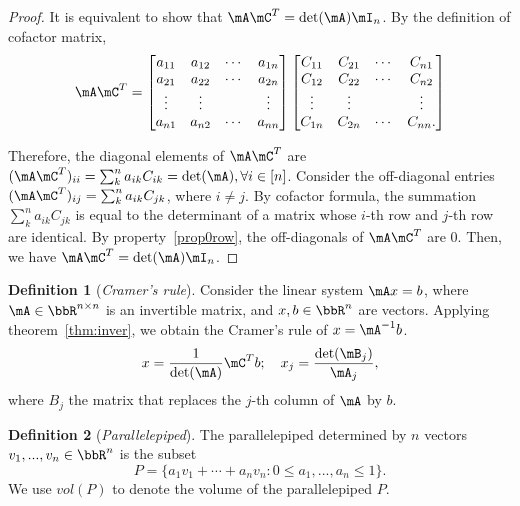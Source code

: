 \documentclass[11pt]{article}
\theoremstyle{plain}
\theoremstyle{definition}
\newtheorem{defn}{Definition}
\begin{document}
\begin{proof}
	It is equivalent to  show that $\mA \mC^T = \det(\mA) \mI_n$. By the definition of cofactor matrix,
	\begin{align}
		\mA  \mC^T = \begin{bmatrix}
			a_{11} & a_{12} &\cdots &a_{1n}\\
			a_{21} & a_{22} &\cdots &a_{2n}\\
			\vdots & \vdots & & \vdots\\
			a_{n1} & a_{n2} &\cdots &a_{nn}\\
		\end{bmatrix} \begin{bmatrix}
			C_{11} & C_{21} &\cdots &C_{n1}\\
			C_{12} & C_{22} &\cdots &C_{n2}\\
			\vdots & \vdots & & \vdots\\
			C_{1n} & C_{2n} &\cdots &C_{nn}.\\
		\end{bmatrix}
	\end{align}
	
	Therefore, the diagonal elements of $\mA \mC^T$ are $(\mA \mC^T)_{ii} = \sum_k^n a_{ik} C_{ik} = \det(\mA), \forall i \in [n]$. Consider the off-diagonal entries $(\mA \mC^T)_{ij} = \sum_{k}^n a_{ik} C_{jk}$, where $i \neq j$. By cofactor formula, the summation   $ \sum_{k}^n a_{ik} C_{jk}$ is equal to the determinant of a matrix whose $i$-th row and $j$-th row are identical. By property~\ref{prop0row}, the off-diagonals of $\mA \mC^T$ are 0. Then, we have $\mA \mC^T = \det(\mA) \mI_n$.
\end{proof}

\begin{defn}[\textit{Cramer's rule}]
Consider the linear system $\mA x=b$, where $\mA\in\bbR^{n \times n}$ is an invertible matrix, and $ x, b \in \bbR^n$ are vectors. Applying theorem~\ref{thm:inver}, we obtain the Cramer's rule of $x = \mA^{-1} b$.
\[  x = \frac{1}{\det(\mA)} \mC^T b; \quad x_j = \frac{\det(\mB_j)}{\mA_j}, \] 
	where $B_j$ the matrix that replaces the $j$-th column of $\mA$ by $b$.
\end{defn}

\begin{defn}[\textit{Parallelepiped}]
	The parallelepiped determined by $n$ vectors $v_1,...,v_n \in \bbR^n$ is the subset 
	\[ P = \{ a_1 v_1 + \cdots + a_n v_n : 0 \leq a_1,...,a_n \leq 1 \}. \]
	 We use $vol(P)$ to denote the volume of the parallelepiped  $P$. 
\end{defn}
\end{document}
